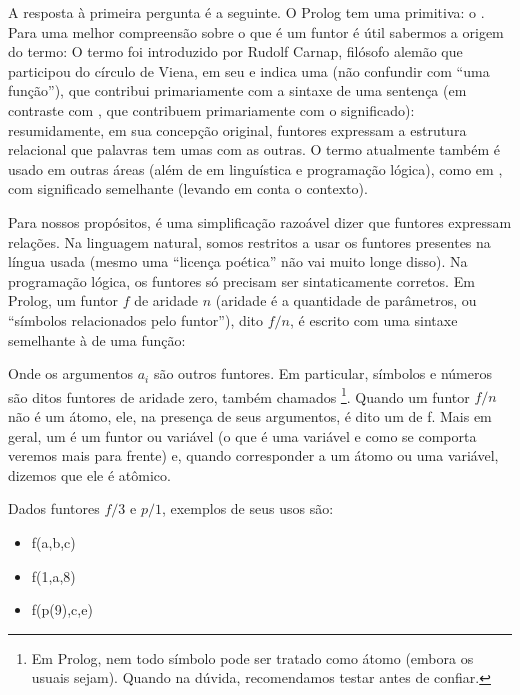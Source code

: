 \documentclass{article}
\begin{document}
A resposta à primeira pergunta é a seguinte. O Prolog tem uma primitiva: o . Para uma melhor compreensão sobre o que é um
funtor é útil sabermos a origem do termo: O termo  foi introduzido por Rudolf Carnap, filósofo alemão que
participou do círculo de Viena, em seu \cite{carnap} e indica uma 
(não confundir com ``uma função''), que contribui primariamente com a sintaxe de uma sentença (em contraste com ,
que contribuem primariamente com o significado): resumidamente, em sua concepção original, funtores expressam a estrutura
relacional que palavras tem umas com as outras. O termo atualmente também é usado em outras áreas (além de em linguística e
programação lógica), como em , com significado semelhante (levando em conta o contexto).

Para nossos propósitos, é uma simplificação razoável dizer que funtores expressam relações. Na linguagem natural, somos restritos a usar os funtores presentes na língua usada (mesmo uma ``licença poética'' não vai muito longe disso).
Na programação lógica, os funtores só precisam ser sintaticamente corretos. Em Prolog, um funtor $f$ de aridade $n$ (aridade é a quantidade de parâmetros, ou ``símbolos relacionados pelo funtor''), dito
$f/n$, é escrito com uma sintaxe semelhante à de uma função:


Onde os argumentos $a_i$ são outros funtores. Em particular, símbolos e números são ditos funtores de aridade zero, também chamados \footnote{Em Prolog, nem todo símbolo pode ser tratado como átomo (embora os usuais sejam). Quando na dúvida, recomendamos testar antes de confiar.}. Quando um funtor $f/n$ não é um átomo, ele, na presença de seus argumentos,
é dito um  de  f. Mais em geral, um  é um funtor ou variável (o que é uma variável e como se comporta  veremos mais para frente) e, quando corresponder a um átomo ou uma variável, dizemos que ele é atômico.

Dados funtores $f/3$ e $p/1$, exemplos de seus usos são:

\begin{itemize}
  \item f(a,b,c)
  \item f(1,a,8)
  \item f(p(9),c,e)
\end{itemize}
\end{document}
